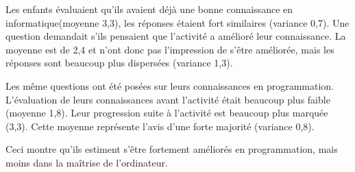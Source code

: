 Les enfants évaluaient qu'ils avaient déjà une bonne connaissance en informatique(moyenne 3,3), les réponses étaient fort similaires (variance 0,7). Une question demandait s'ils pensaient que l'activité a amélioré leur connaissance. La moyenne est de 2,4  et n'ont donc pas l'impression de s'être améliorée, mais les réponses sont beaucoup plus dispersées (variance 1,3).

Les même questions ont été posées sur leurs connaissances en programmation. L'évaluation de leurs connaissances avant l'activité était beaucoup plus faible (moyenne 1,8). Leur progression suite à l'activité est beaucoup plus marquée (3,3). Cette moyenne représente l'avis d'une forte majorité (variance 0,8).

Ceci montre qu'ils estiment s'être fortement améliorés en programmation, mais moins dans la maîtrise de l'ordinateur.


